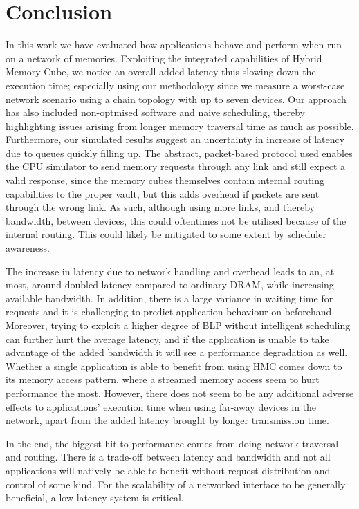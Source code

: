 \chapter{Conclusion}
In this work we have evaluated how applications behave and perform when run on a network of memories. Exploiting the integrated capabilities of Hybrid Memory Cube, we notice an overall added latency thus slowing down the execution time; especially using our methodology since we measure a worst-case network scenario using a chain topology with up to seven devices. Our approach has also included non-optmised software and naive scheduling, thereby highlighting issues arising from longer memory traversal time as much as possible. Furthermore, our simulated results suggest an uncertainty in increase of latency due to queues quickly filling up. The abstract, packet-based protocol used enables the CPU simulator to send memory requests through any link and still expect a valid response, since the memory cubes themselves contain internal routing capabilities to the proper vault, but this adds overhead if packets are sent through the wrong link. As such, although using more links, and thereby bandwidth, between devices, this could oftentimes not be utilised because of the internal routing. This could likely be mitigated to some extent by scheduler awareness.
\bigskip

The increase in latency due to network handling and overhead leads to an, at most, around doubled latency compared to ordinary DRAM, while increasing available bandwidth. In addition, there is a large variance in waiting time for requests and it is challenging to predict application behaviour on beforehand. Moreover, trying to exploit a higher degree of BLP without intelligent scheduling can further hurt the average latency, and if the application is unable to take advantage of the added bandwidth it will see a performance degradation as well. Whether a single application is able to benefit from using HMC comes down to its memory access pattern, where a streamed memory access seem to hurt performance the most. However, there does not seem to be any additional adverse effects to applications' execution time when using far-away devices in the network, apart from the added latency brought by longer transmission time.
\bigskip

In the end, the biggest hit to performance comes from doing network traversal and routing. There is a trade-off between latency and bandwidth and not all applications will natively be able to benefit without request distribution and control of some kind. For the scalability of a networked interface to be generally beneficial, a low-latency system is critical.